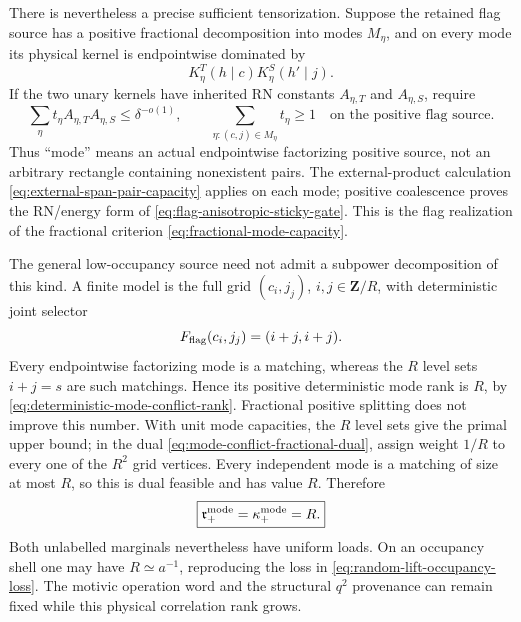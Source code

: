 \documentclass[11pt]{article}
\begin{document}
There is nevertheless a precise sufficient tensorization.  Suppose the
retained flag source has a positive fractional decomposition into modes
\(M_\eta\), and on every mode its physical kernel is endpointwise dominated
by
\[
 K_\eta^{T}(h\mid c)K_\eta^{S}(h'\mid j).
\]
If the two unary kernels have inherited RN constants
\(A_{\eta,T}\) and \(A_{\eta,S}\), require
\begin{equation}\label{eq:flag-fractional-mode-capacity}
 \boxed{
 \sum_\eta t_\eta A_{\eta,T}A_{\eta,S}
 \le\delta^{-o(1)},
 \qquad
 \sum_{\eta:(c,j)\in M_\eta}t_\eta\ge1
 \quad\text{on the positive flag source}.}
\end{equation}
Thus ``mode'' means an actual endpointwise factorizing positive source, not
an arbitrary rectangle containing nonexistent pairs.  The external-product
calculation \eqref{eq:external-span-pair-capacity} applies on each mode;
positive coalescence proves the RN/energy form of
\eqref{eq:flag-anisotropic-sticky-gate}.  This is the flag realization of
the fractional criterion \eqref{eq:fractional-mode-capacity}.

The general low-occupancy source need not admit a subpower decomposition of
this kind.  A finite model is the full grid
\((c_i,j_j)\), \(i,j\in\mathbf Z/R\), with deterministic joint selector
\begin{equation}\label{eq:flag-diagonal-correlation}
 F_{\rm flag}(c_i,j_j)=(i+j,i+j).
\end{equation}
Every endpointwise factorizing mode is a matching, whereas the \(R\) level
sets \(i+j=s\) are such matchings.  Hence its positive deterministic mode
rank is \(R\), by \eqref{eq:deterministic-mode-conflict-rank}.  Fractional
positive splitting does not improve this number.  With unit mode capacities,
the \(R\) level sets give the primal upper bound; in the dual
\eqref{eq:mode-conflict-fractional-dual}, assign weight \(1/R\) to every one
of the \(R^2\) grid vertices.  Every independent mode is a matching of size at
most \(R\), so this is dual feasible and has value \(R\).  Therefore
\begin{equation}\label{eq:flag-diagonal-fractional-obstruction}
 \boxed{\mathfrak r_{+}^{\rm mode}
 =\kappa_{+}^{\rm mode}=R.}
\end{equation}
Both unlabelled marginals nevertheless have uniform loads.  On an occupancy
shell one may have \(R\simeq a^{-1}\), reproducing the loss in
\eqref{eq:random-lift-occupancy-loss}.  The motivic operation word and the
structural \(q^2\) provenance can remain fixed while this physical
correlation rank grows.
\end{document}
